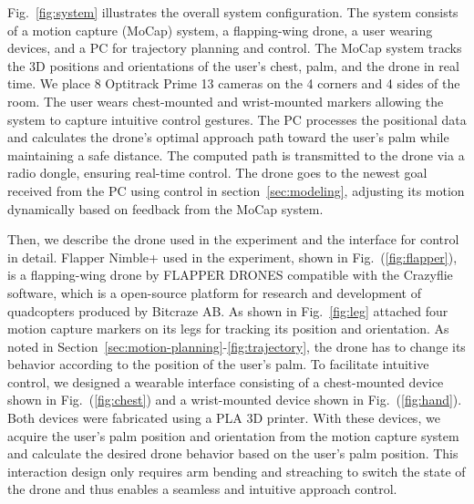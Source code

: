Fig.~\ref{fig:system} illustrates the overall system configuration.
The system consists of a motion capture (MoCap) system, a flapping-wing drone, a user wearing devices, and a PC for trajectory planning and control.
The MoCap system tracks the 3D positions and orientations of the user's chest, palm, and the drone in real time.
We place 8 Optitrack Prime 13 cameras on the 4 corners and 4 sides of the room.  
The user wears chest-mounted and wrist-mounted markers allowing the system to capture intuitive control gestures. 
The PC processes the positional data and calculates the drone's optimal approach path toward the user's palm while maintaining a safe distance. 
The computed path is transmitted to the drone via a radio dongle, ensuring real-time control. 
The drone goes to the newest goal received from the PC using control in section~\ref{sec:modeling}, 
adjusting its motion dynamically based on feedback from the MoCap system.

Then, we describe the drone used in the experiment and the interface for control in detail.
Flapper Nimble+ used in the experiment, shown in Fig.~(\ref{fig:flapper}), is a flapping-wing drone by FLAPPER DRONES compatible with the Crazyflie software, 
which is a open-source platform for research and development of quadcopters produced by Bitcraze AB. 
As shown in Fig.~\ref{fig:leg} attached four motion capture markers on its legs for tracking its position and orientation. 
As noted in Section~\ref{sec:motion-planning}-\ref{fig:trajectory}, the drone has to change its behavior according to the position of the user's palm.
To facilitate intuitive control, we designed a wearable interface consisting of 
a chest-mounted device shown in Fig.~(\ref{fig:chest}) and 
a wrist-mounted device shown in Fig.~(\ref{fig:hand}).
Both devices were fabricated using a PLA 3D printer. 
With these devices, we acquire the user's palm position and orientation from the motion capture system and calculate the desired drone behavior based on the user's palm position. 
This interaction design only requires arm bending and streaching to switch the state of the drone and thus enables a seamless and intuitive approach control.
